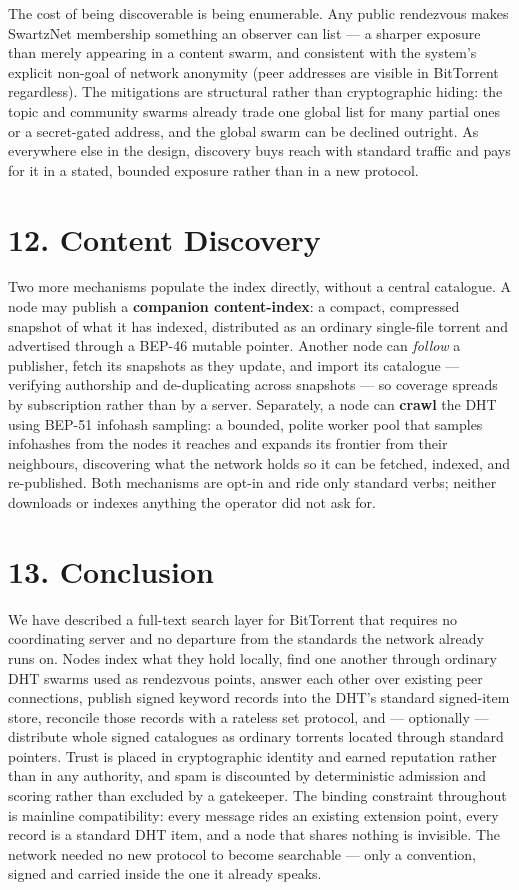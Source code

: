 \documentclass[11pt]{article}
\begin{document}
The cost of being discoverable is being enumerable. Any public
rendezvous makes SwartzNet membership something an observer can list ---
a sharper exposure than merely appearing in a content swarm, and
consistent with the system's explicit non-goal of network anonymity
(peer addresses are visible in BitTorrent regardless). The mitigations
are structural rather than cryptographic hiding: the topic and community
swarms already trade one global list for many partial ones or a
secret-gated address, and the global swarm can be declined outright. As
everywhere else in the design, discovery buys reach with standard
traffic and pays for it in a stated, bounded exposure rather than in a
new protocol.

\hypertarget{content-discovery}{%
\section{12. Content Discovery}\label{content-discovery}}

Two more mechanisms populate the index directly, without a central
catalogue. A node may publish a \textbf{companion content-index}: a
compact, compressed snapshot of what it has indexed, distributed as an
ordinary single-file torrent and advertised through a BEP-46 mutable
pointer. Another node can \emph{follow} a publisher, fetch its snapshots
as they update, and import its catalogue --- verifying authorship and
de-duplicating across snapshots --- so coverage spreads by subscription
rather than by a server. Separately, a node can \textbf{crawl} the DHT
using BEP-51 infohash sampling: a bounded, polite worker pool that
samples infohashes from the nodes it reaches and expands its frontier
from their neighbours, discovering what the network holds so it can be
fetched, indexed, and re-published. Both mechanisms are opt-in and ride
only standard verbs; neither downloads or indexes anything the operator
did not ask for.

\hypertarget{conclusion}{%
\section{13. Conclusion}\label{conclusion}}

We have described a full-text search layer for BitTorrent that requires
no coordinating server and no departure from the standards the network
already runs on. Nodes index what they hold locally, find one another
through ordinary DHT swarms used as rendezvous points, answer each other
over existing peer connections, publish signed keyword records into the
DHT's standard signed-item store, reconcile those records with a
rateless set protocol, and --- optionally --- distribute whole signed
catalogues as ordinary torrents located through standard pointers. Trust
is placed in cryptographic identity and earned reputation rather than in
any authority, and spam is discounted by deterministic admission and
scoring rather than excluded by a gatekeeper. The binding constraint
throughout is mainline compatibility: every message rides an existing
extension point, every record is a standard DHT item, and a node that
shares nothing is invisible. The network needed no new protocol to
become searchable --- only a convention, signed and carried inside the
one it already speaks.
\end{document}
